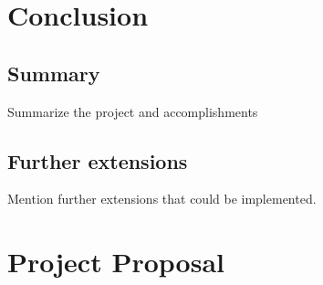 \documentclass[12pt,a4paper,twoside,openright]{report}
\begin{document}
\chapter{Conclusion}

\section{Summary}
Summarize the project and accomplishments

\section{Further extensions}
Mention further extensions that could be implemented.




\appendix

\chapter{Project Proposal}


\end{document}
